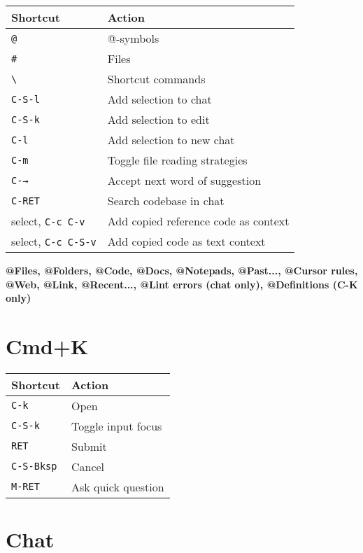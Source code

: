 \documentclass[10pt,landscape]{article}
\newcommand{\key}[1]{\textcolor{keycolor}{\texttt{#1}}}
\begin{document}
\begin{multicols}{2}
\begin{tabular}{@{}p{3cm}p{6.5cm}@{}}
\toprule
\textbf{Shortcut} & \textbf{Action} \\
\midrule
\key{@} & @-symbols \\
\key{\#} & Files \\
\key{\textbackslash} & Shortcut commands \\
\key{C-S-l} & Add selection to chat \\
\key{C-S-k} & Add selection to edit \\
\key{C-l} & Add selection to new chat \\
\key{C-m} & Toggle file reading strategies \\
\key{C-→} & Accept next word of suggestion \\
\key{C-RET} & Search codebase in chat \\
select, \key{C-c C-v} & Add copied reference code as context \\
select, \key{C-c C-S-v} & Add copied code as text context \\
\bottomrule
\end{tabular}

{\small\textbf{@Files, @Folders, @Code, @Docs, @Notepads, @Past..., @Cursor rules, @Web, @Link, @Recent..., @Lint errors (chat only), @Definitions (C-K only)}}

\section*{\textcolor{sectioncolor}{Cmd+K}}

\begin{tabular}{@{}p{3cm}p{6.5cm}@{}}
\toprule
\textbf{Shortcut} & \textbf{Action} \\
\midrule
\key{C-k} & Open \\
\key{C-S-k} & Toggle input focus \\
\key{RET} & Submit \\
\key{C-S-Bksp} & Cancel \\
\key{M-RET} & Ask quick question \\
\bottomrule
\end{tabular}

\section*{\textcolor{sectioncolor}{Chat}}


\end{multicols}
\end{document}
